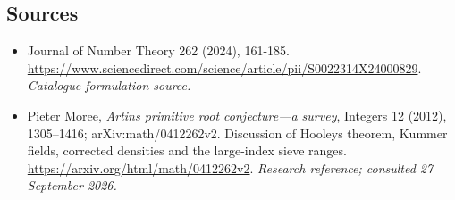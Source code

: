 \documentclass[11pt,a4paper]{article}
\numberwithin{equation}{section}
\begin{document}
\subsection{Sources}
\begin{itemize}\raggedright
\item[\textnormal{[S1]}]\hypertarget{source:statement:1}{} Journal of Number Theory 262 (2024), 161-185.
\url{https://www.sciencedirect.com/science/article/pii/S0022314X24000829}.
{\small\textit{Catalogue formulation source.}}
\item[\textnormal{[E1]}]\hypertarget{extra:statement:1}{} Pieter Moree, \emph{Artin\textquotesingle s primitive root conjecture---a survey}, Integers 12 (2012), 1305--1416; arXiv:math/0412262v2. Discussion of Hooley\textquotesingle s theorem, Kummer fields, corrected densities and the large-index sieve ranges.
\url{https://arxiv.org/html/math/0412262v2}.
{\small\textit{Research reference; consulted 27 September 2026.}}
\end{itemize}
\end{document}
